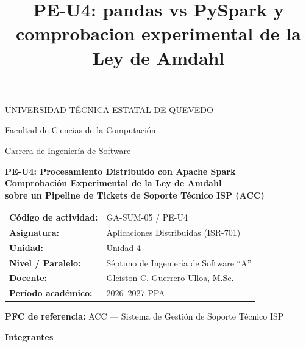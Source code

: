 \documentclass[11pt,a4paper]{article}
\title{PE-U4: pandas vs PySpark y comprobacion experimental de la Ley de Amdahl}
\author{}
\date{}
\begin{document}

\begin{titlepage}
\centering
{\large UNIVERSIDAD T\'ECNICA ESTATAL DE QUEVEDO\par}
{\large Facultad de Ciencias de la Computaci\'on\par}
{\large Carrera de Ingenier\'ia de Software\par}

\vspace{1.2cm}
{\Large\bfseries PE-U4: Procesamiento Distribuido con Apache Spark\\[2pt]
Comprobaci\'on Experimental de la Ley de Amdahl\\[2pt]
sobre un Pipeline de Tickets de Soporte T\'ecnico ISP (ACC)\par}

\vspace{0.8cm}
\begin{tabular}{@{}ll@{}}
\textbf{C\'odigo de actividad:} & GA-SUM-05 / PE-U4 \\
\textbf{Asignatura:} & Aplicaciones Distribuidas (ISR-701) \\
\textbf{Unidad:} & Unidad 4 \\
\textbf{Nivel / Paralelo:} & S\'eptimo de Ingenier\'ia de Software ``A'' \\
\textbf{Docente:} & Gleiston C. Guerrero-Ulloa, M.Sc. \\
\textbf{Per\'iodo acad\'emico:} & 2026--2027 PPA \\
\end{tabular}

\vspace{0.8cm}
\textbf{PFC de referencia:} ACC --- Sistema de Gesti\'on de Soporte T\'ecnico ISP

\vspace{0.6cm}
{\large\textbf{Integrantes}\par}
\vspace{0.2cm}


\end{titlepage}
\end{document}
